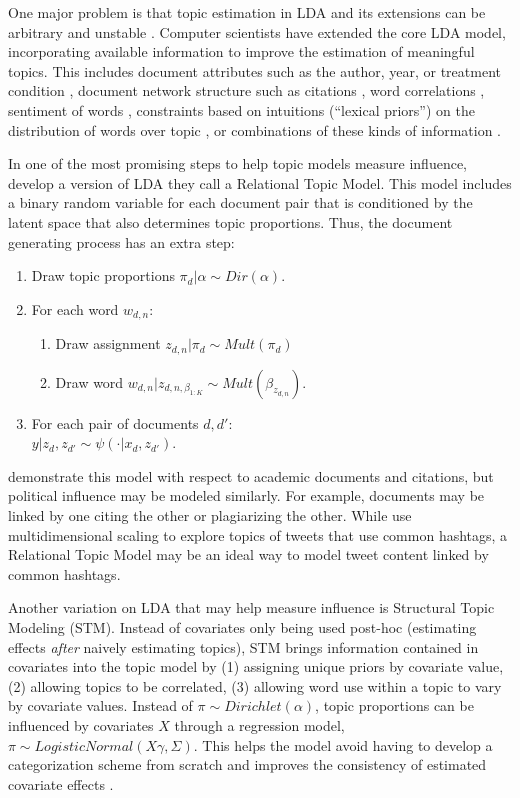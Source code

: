 \documentclass{article}
\begin{document}
One major problem is that topic estimation in LDA and its extensions can be arbitrary and unstable \citep{Jagarlamudi2012}. Computer scientists have extended the core LDA model, incorporating available information to improve the estimation of meaningful topics. This includes document attributes such as the author, year, or treatment condition \citep{Roberts2014}, document network structure such as citations \citep{Chang2009}, word correlations \citep{Blei2005}, sentiment of words%
, constraints based on intuitions (``lexical priors'') on the distribution of words over topic \citep{Jagarlamudi2012}, or combinations of these kinds of information \citep{Kang2014}. 

In one of the most promising steps to help topic models measure influence, \citet{Chang2009} develop a version of LDA they call a Relational Topic Model. This model includes a binary random variable for each document pair that is conditioned by the latent space that also determines topic proportions. Thus, the document generating process has an extra step:
\begin{enumerate}
\item Draw topic proportions $\pi_d | \alpha \sim Dir(\alpha).$
\item For each word $w_{d,n}$:\begin{enumerate}
\item Draw assignment $z_{d, n} | \pi_d \sim Mult(\pi_d)$
\item Draw word $w_{d,n} | z_{d,n,\beta_{1:K}} \sim Mult(\beta_{z_{d,n}}).$\end{enumerate}
\item  For each pair of documents $d,d'$:\\ $y|z_d, z_{d'} \sim \psi (\cdot |x_d, z_{d'})$.
\end{enumerate}
	
\citet{Chang2009} demonstrate this model with respect to academic documents and citations, but political influence may be modeled similarly. For example, documents may be linked by one citing the other or plagiarizing the other. While \citet{Bode2014CandidateMidterms} use multidimensional scaling to explore topics of tweets that use common hashtags, a Relational Topic Model may be an ideal way to model tweet content linked by common hashtags.

Another variation on LDA that may help measure influence is Structural Topic Modeling (STM). Instead of covariates only being used post-hoc (estimating effects \textit{after} naively estimating topics), STM brings information contained in covariates into the topic model by (1) assigning unique priors by covariate value, (2) allowing topics to be correlated, (3) allowing word use within a topic to vary by covariate values. Instead of $\pi \sim Dirichlet(\alpha)$, topic proportions can be influenced by covariates $X$ through a regression model, $\pi \sim LogisticNormal(X\gamma, \Sigma)$. This helps the model avoid having to develop a categorization scheme from scratch \citep{Grimmer2011} and improves the consistency of estimated covariate effects \citep{Roberts2014}.
\end{document}
